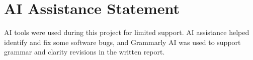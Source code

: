 \documentclass[12pt]{article}
\begin{document}
\section*{AI Assistance Statement}

AI tools were used during this project for limited support. AI assistance helped identify and fix some software bugs, and Grammarly AI was used to support grammar and clarity revisions in the written report.

\nocite{*}


\end{document}
